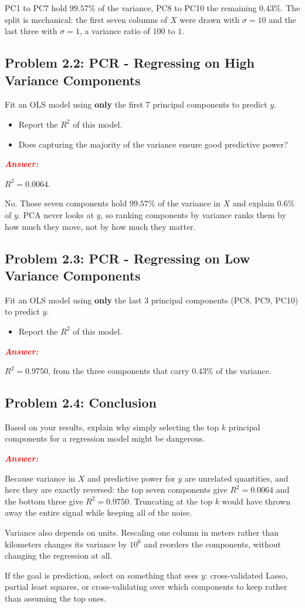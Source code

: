 \documentclass[11pt, letterpaper]{article}
\newcommand{\subproblem}[1]{\subsection*{Problem #1}}
\newcommand{\answer}{\textbf{\textit{\textcolor{red}{Answer:}}}}
\begin{document}
PC1 to PC7 hold $99.57\%$ of the variance, PC8 to PC10 the remaining $0.43\%$. The split is
mechanical: the first seven columns of $X$ were drawn with $\sigma = 10$ and the last three with
$\sigma = 1$, a variance ratio of $100$ to $1$.


\subproblem{2.2: PCR - Regressing on High Variance Components}
Fit an OLS model using \textbf{only} the first 7 principal components to predict $y$.
\begin{itemize}
    \item Report the $R^2$ of this model.
    \item Does capturing the majority of the variance ensure good predictive power?
\end{itemize}

\answer

$R^2 = \mathbf{0.0064}$.

No. Those seven components hold $99.57\%$ of the variance in $X$ and explain $0.6\%$ of $y$. PCA
never looks at $y$, so ranking components by variance ranks them by how much they move, not by how
much they matter.


\subproblem{2.3: PCR - Regressing on Low Variance Components}
Fit an OLS model using \textbf{only} the last 3 principal components (PC8, PC9, PC10) to predict $y$.
\begin{itemize}
    \item Report the $R^2$ of this model.
\end{itemize}

\answer

$R^2 = \mathbf{0.9750}$, from the three components that carry $0.43\%$ of the variance.


\subproblem{2.4: Conclusion}
Based on your results, explain why simply selecting the top $k$ principal components for a regression model might be dangerous.

\answer

Because variance in $X$ and predictive power for $y$ are unrelated quantities, and here they are
exactly reversed: the top seven components give $R^2 = 0.0064$ and the bottom three give
$R^2 = 0.9750$. Truncating at the top $k$ would have thrown away the entire signal while keeping
all of the noise.

Variance also depends on units. Rescaling one column in meters rather than kilometers changes its
variance by $10^6$ and reorders the components, without changing the regression at all.

If the goal is prediction, select on something that sees $y$: cross-validated Lasso, partial least
squares, or cross-validating over which components to keep rather than assuming the top ones.
\end{document}
